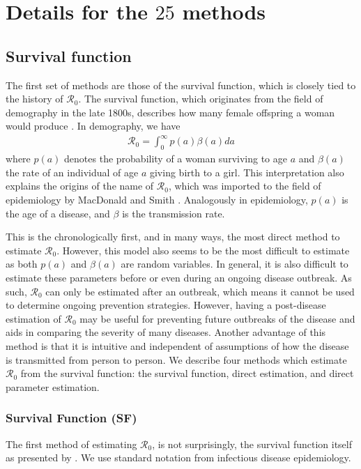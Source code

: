 \documentclass[12pt]{article}
\newcommand{\XX}{\ensuremath{25}} %
\newcommand{\rr}{\ensuremath{\mathcal{R}_0}}
\begin{document}
\section{Details for the $\XX$ methods}
\label{sec:details}
\subsection{Survival function}
\label{sec:direct}

The first set of methods are those of the survival function, which is closely  tied to the history of $\rr$.  The survival function, which originates from the field of demography in the late 1800s, describes how many female offspring a woman would produce \citep{dietz1993estimation}.  In demography, we have
\begin{align*}
\rr = \int_0^\infty p(a) \beta(a) da
\end{align*}
where $p(a)$ denotes the probability of a woman surviving to age $a$ and $\beta(a)$ the rate of an individual of age $a$ giving birth to a  girl.   This interpretation also explains the origins of the name of $\rr$, which was imported to the field of epidemiology by MacDonald and Smith \citep{dietz1993estimation}.  Analogously in epidemiology, $p(a)$ is the age of a disease, and $\beta$ is the transmission rate.

This is the chronologically first, and in many ways, the most direct method to estimate $\rr$.  However, this model also seems to be the most difficult to estimate as both $p(a)$ and $\beta (a)$ are random variables.   In general, it is also difficult to estimate these parameters before or even during an ongoing disease outbreak.  As such, $\rr$ can only be estimated after an outbreak, which means it cannot be used to determine ongoing prevention strategies.  However, having a post-disease estimation of $\rr$ may be useful for preventing future outbreaks of the disease and aids in comparing the severity of many diseases.  Another advantage of this method is that it is intuitive and independent of assumptions of how the disease is transmitted from person to person.    We describe four methods which estimate $\rr$ from the survival function:  the survival function, direct estimation, and direct parameter estimation.


\subsubsection{Survival Function (SF)}
\label{sec:survival_fxn}
The first method of estimating $\rr$, is not surprisingly, the survival function itself as presented by \cite{Heffernan2005}.  We use standard notation from infectious disease epidemiology.
\end{document}
